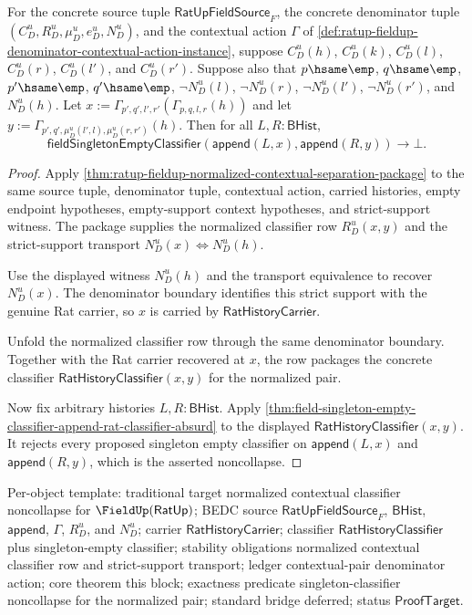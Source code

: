 \begin{theorem}
\label{thm:ratup-fieldup-normalized-contextual-singleton-classifier-separation}
For the concrete source tuple $\mathsf{RatUpFieldSource}_F$, the concrete
denominator tuple $(C_D^u,R_D^u,\mu_D^u,e_D^u,N_D^u)$, and the contextual
action $\Gamma$ of
\autoref{def:ratup-fieldup-denominator-contextual-action-instance}, suppose
$C_D^u(h)$, $C_D^u(k)$, $C_D^u(l)$, $C_D^u(r)$, $C_D^u(l')$, and
$C_D^u(r')$. Suppose also that $p\hsame\emp$, $q\hsame\emp$, $p'\hsame\emp$,
$q'\hsame\emp$, $\neg N_D^u(l)$, $\neg N_D^u(r)$, $\neg N_D^u(l')$,
$\neg N_D^u(r')$, and $N_D^u(h)$. Let
$x:=\Gamma_{p',q',l',r'}(\Gamma_{p,q,l,r}(h))$ and let
$y:=\Gamma_{p',q',\mu_D^u(l',l),\mu_D^u(r,r')}(h)$. Then for all
$L,R:\mathsf{BHist}$,
$$
\mathsf{fieldSingletonEmptyClassifier}(\mathsf{append}(L,x),\mathsf{append}(R,y))
\to\bot.
$$
\end{theorem}
\begin{proof}
Apply
\autoref{thm:ratup-fieldup-normalized-contextual-separation-package} to the
same source tuple, denominator tuple, contextual action, carried histories,
empty endpoint hypotheses, empty-support context hypotheses, and strict-support
witness. The package supplies the normalized classifier row $R_D^u(x,y)$ and
the strict-support transport
$N_D^u(x)\Longleftrightarrow N_D^u(h)$.

Use the displayed witness $N_D^u(h)$ and the transport equivalence to recover
$N_D^u(x)$. The denominator boundary identifies this strict support with the
genuine Rat carrier, so $x$ is carried by $\mathsf{RatHistoryCarrier}$.

Unfold the normalized classifier row through the same denominator boundary.
Together with the Rat carrier recovered at $x$, the row packages the concrete
classifier $\mathsf{RatHistoryClassifier}(x,y)$ for the normalized pair.

Now fix arbitrary histories $L,R:\mathsf{BHist}$. Apply
\autoref{thm:field-singleton-empty-classifier-append-rat-classifier-absurd} to
the displayed $\mathsf{RatHistoryClassifier}(x,y)$. It rejects every proposed
singleton empty classifier on
$\mathsf{append}(L,x)$ and $\mathsf{append}(R,y)$, which is the asserted
noncollapse.
\end{proof}

Per-object template: traditional target normalized contextual classifier
noncollapse for $\FieldUp(\mathsf{RatUp})$; BEDC source
$\mathsf{RatUpFieldSource}_F$, $\mathsf{BHist}$, $\mathsf{append}$, $\Gamma$,
$R_D^u$, and $N_D^u$; carrier $\mathsf{RatHistoryCarrier}$; classifier
$\mathsf{RatHistoryClassifier}$ plus singleton-empty classifier; stability
obligations normalized contextual classifier row and strict-support transport;
ledger contextual-pair denominator action; core theorem this block; exactness
predicate singleton-classifier noncollapse for the normalized pair; standard
bridge deferred; status $\mathsf{ProofTarget}$.
